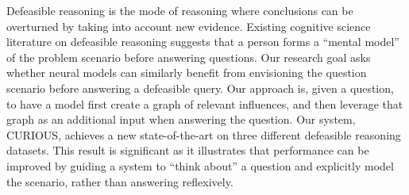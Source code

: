 Defeasible reasoning is the mode of reasoning where conclusions can be overturned by taking into account new evidence. Existing cognitive science literature on defeasible reasoning suggests that a person forms a ``mental model'' of the problem scenario before answering questions. Our research goal asks whether neural models can similarly benefit from envisioning the question scenario before answering a defeasible query. Our approach is, given a question, to have a model first create a graph of relevant influences, and then leverage that graph as an additional input when answering the question. Our system, CURIOUS, achieves a new state-of-the-art on three different defeasible reasoning datasets. This result is significant as it illustrates that performance can be improved by guiding a system to ``think about'' a question and explicitly model the scenario, rather than answering reflexively.

